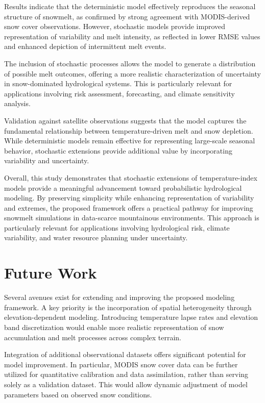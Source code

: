 \documentclass[11pt]{article}
\begin{document}
Results indicate that the deterministic model effectively reproduces the seasonal structure of snowmelt, as confirmed by strong agreement with MODIS-derived snow cover observations. However, stochastic models provide improved representation of variability and melt intensity, as reflected in lower RMSE values and enhanced depiction of intermittent melt events.

The inclusion of stochastic processes allows the model to generate a distribution of possible melt outcomes, offering a more realistic characterization of uncertainty in snow-dominated hydrological systems. This is particularly relevant for applications involving risk assessment, forecasting, and climate sensitivity analysis.

Validation against satellite observations suggests that the model captures the fundamental relationship between temperature-driven melt and snow depletion. While deterministic models remain effective for representing large-scale seasonal behavior, stochastic extensions provide additional value by incorporating variability and uncertainty.

Overall, this study demonstrates that stochastic extensions of temperature-index models provide a meaningful advancement toward probabilistic hydrological modeling. By preserving simplicity while enhancing representation of variability and extremes, the proposed framework offers a practical pathway for improving snowmelt simulations in data-scarce mountainous environments. This approach is particularly relevant for applications involving hydrological risk, climate variability, and water resource planning under uncertainty.
	
\section{Future Work}

Several avenues exist for extending and improving the proposed modeling framework. A key priority is the incorporation of spatial heterogeneity through elevation-dependent modeling. Introducing temperature lapse rates and elevation band discretization would enable more realistic representation of snow accumulation and melt processes across complex terrain.

Integration of additional observational datasets offers significant potential for model improvement. In particular, MODIS snow cover data can be further utilized for quantitative calibration and data assimilation, rather than serving solely as a validation dataset. This would allow dynamic adjustment of model parameters based on observed snow conditions.
\end{document}
